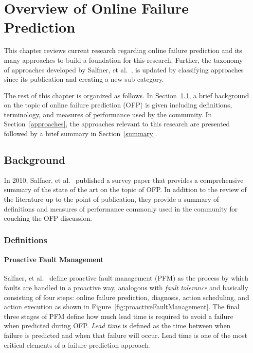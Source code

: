 \chapter{Overview of Online Failure Prediction} \label{chapter2}
This chapter reviews current research regarding online failure prediction and
its many approaches to build a foundation for this research.  Further, the
taxonomy of approaches developed by Salfner, et al.~\cite{salfnerSurvey}, is
updated by classifying approaches since its publication and creating a new
sub-category.

The rest of this chapter is organized as follows.  In Section~\ref{background},
a brief background on the topic of online failure prediction (OFP) is given
including definitions, terminology, and measures of performance used by the
community.  In Section~\ref{approaches}, the approaches relevant to this
research are presented followed by a brief summary in Section~\ref{summary}.

\section{Background} \label{background}
In 2010, Salfner, et al.~\cite{salfnerSurvey} published a survey paper that
provides a comprehensive summary of the state of the art on the topic of OFP.
In addition to the review of the literature up to the point of publication,
they provide a summary of definitions and measures of performance commonly used
in the community for couching the OFP discussion.

\subsection{Definitions} \label{definitions}
\subsubsection{Proactive Fault Management} \label{pfm}
Salfner, et al.~\cite{salfnerSurvey} define proactive fault management (PFM) as
the process by which faults are handled in a proactive way, analogous with
\emph{fault tolerance} and basically consisting of four steps: online failure
prediction, diagnosis, action scheduling, and action execution as shown in
Figure~\ref{fig:proactiveFaultManagement}.
The final three stages of PFM define how much lead time is required to avoid a
failure when predicted during OFP.  \emph{Lead time} is defined as the time
between when failure is predicted and when that failure will occur.  Lead time
is one of the most critical elements of a failure prediction approach.

